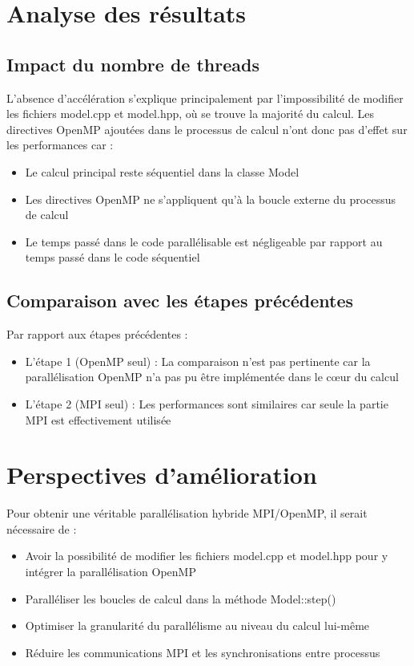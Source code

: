 \documentclass[11pt]{article}
\begin{document}
\section{Analyse des résultats}

\subsection{Impact du nombre de threads}
L'absence d'accélération s'explique principalement par l'impossibilité de modifier les fichiers model.cpp et model.hpp, où se trouve la majorité du calcul. Les directives OpenMP ajoutées dans le processus de calcul n'ont donc pas d'effet sur les performances car :

\begin{itemize}
    \item Le calcul principal reste séquentiel dans la classe Model
    \item Les directives OpenMP ne s'appliquent qu'à la boucle externe du processus de calcul
    \item Le temps passé dans le code parallélisable est négligeable par rapport au temps passé dans le code séquentiel
\end{itemize}

\subsection{Comparaison avec les étapes précédentes}
Par rapport aux étapes précédentes :
\begin{itemize}
    \item L'étape 1 (OpenMP seul) : La comparaison n'est pas pertinente car la parallélisation OpenMP n'a pas pu être implémentée dans le cœur du calcul
    \item L'étape 2 (MPI seul) : Les performances sont similaires car seule la partie MPI est effectivement utilisée
\end{itemize}

\section{Perspectives d'amélioration}
Pour obtenir une véritable parallélisation hybride MPI/OpenMP, il serait nécessaire de :

\begin{itemize}
    \item Avoir la possibilité de modifier les fichiers model.cpp et model.hpp pour y intégrer la parallélisation OpenMP
    \item Paralléliser les boucles de calcul dans la méthode Model::step()
    \item Optimiser la granularité du parallélisme au niveau du calcul lui-même
    \item Réduire les communications MPI et les synchronisations entre processus
\end{itemize}
\end{document}
